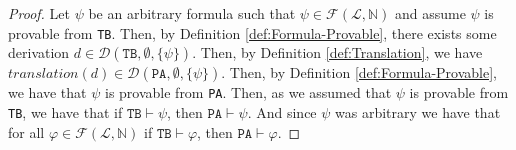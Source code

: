 \begin{proof}
    \leanok
    Let $\psi$ be an arbitrary formula such that $\psi \in \mathcal{F}(\mathcal{L},\mathbb{N})$ and assume $\psi$ is provable from \texttt{TB}. Then, by Definition \ref{def:Formula-Provable}, there exists some derivation $d \in \mathcal{D}(\texttt{TB},\emptyset,\{\psi\})$. Then, by Definition \ref{def:Translation}, we have $translation(d) \in \mathcal{D}(\texttt{PA},\emptyset,\{\psi\})$. Then, by Definition \ref{def:Formula-Provable}, we have that $\psi$ is provable from \texttt{PA}. Then, as we assumed that $\psi$ is provable from \texttt{TB}, we have that if $\texttt{TB} \vdash \psi$, then $\texttt{PA} \vdash \psi$. And since $\psi$ was arbitrary we have that for all $\varphi \in \mathcal{F}(\mathcal{L}, \mathbb{N})$ if $\texttt{TB} \vdash \varphi$, then $\texttt{PA} \vdash \varphi$.
\end{proof}



